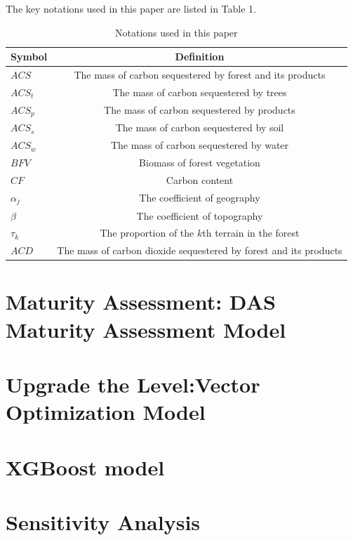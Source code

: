 \documentclass{mcmthesis}  %
\begin{document}
	The key notations used in this paper are listed in Table 1.
	\begin{table}[h!]
		\centering
		\caption{Notations used in this paper}
		\label{tab:notations}
		\renewcommand{\arraystretch}{1.5} 
		\begin{tabular}{lc}
			\toprule
			\textbf{Symbol} & \textbf{Definition} \\
			\midrule
			\rowcolor{LightGreen}
			$ACS$ & The mass of carbon sequestered by forest and its products \\
			$ACS_t$ & The mass of carbon sequestered by trees \\
			\rowcolor{LightGreen}
			$ACS_p$ & The mass of carbon sequestered by products \\
			$ACS_s$ & The mass of carbon sequestered by soil \\
			\rowcolor{LightGreen}
			$ACS_w$ & The mass of carbon sequestered by water \\
			$BFV$ & Biomass of forest vegetation \\
			\rowcolor{LightGreen}
			$CF$ & Carbon content \\
			$\alpha_j$ & The coefficient of geography \\
			\rowcolor{LightGreen}
			$\beta$ & The coefficient of topography \\
			$\tau_k$ & The proportion of the $k$th terrain in the forest \\
			\rowcolor{LightGreen}
			$ACD$ & The mass of carbon dioxide sequestered by forest and its products \\
			\bottomrule
		\end{tabular}
	\end{table}
	
	\section{Maturity Assessment: DAS Maturity Assessment Model} 
	
	\section{Upgrade the Level:Vector Optimization Model}  %
	
	\section{XGBoost model}  %
	
	\section{Sensitivity Analysis}  %
	
\end{document}
